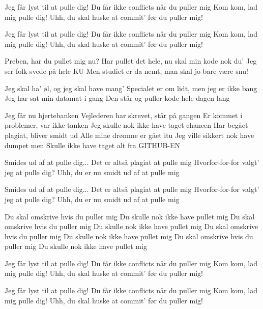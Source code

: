 \documentclass[a4paper,11pt]{article}
\begin{document}
\begin{song}
   Jeg får lyst til at pulle dig!
   Du får ikke conflicts når du puller mig
   Kom kom, lad mig pulle dig!
   Uhh, du skal huske at commit' før du puller mig!

   Jeg får lyst til at pulle dig!
   Du får ikke conflicts når du puller mig
   Kom kom, lad mig pulle dig!
   Uhh, du skal huske at commit' før du puller mig!

   Preben, har du pullet mig nu?
  Har pullet det hele, nu skal min kode nok du'
  Jeg ser folk svede på hele KU
  Men studiet er da nemt, man skal jo bare være snu!

  Jeg skal ha' øl, og jeg skal have mang'
  Specialet er om lidt, men jeg er ikke bang
  Jeg har sat min datamat i gang
  Den står og puller kode hele dagen lang

  Jeg får nu hjertebanken
  Vejlederen har skrevet, står på gangen
  Er kommet i problemer, var ikke tanken
  Jeg skulle nok ikke have taget chancen
  Har begået plagiat, bliver smidt ud
  Alle mine drømme er gået itu
  Jeg ville sikkert nok have dumpet men
  Skulle ikke have taget alt fra GITHUB-EN

   Smides ud af at pulle dig...
   Det er altså plagiat at pulle mig
   Hvorfor-for-for valgt' jeg at pulle dig?
   Uhh, du er nu smidt ud af at pulle mig

   Smides ud af at pulle dig...
   Det er altså plagiat at pulle mig
   Hvorfor-for-for valgt' jeg at pulle dig?
   Uhh, du er nu smidt ud af at pulle mig


   Du skal omskrive hvis du puller mig
   Du skulle nok ikke have pullet mig
   Du skal omskrive hvis du puller mig
   Du skulle nok ikke have pullet mig
   Du skal omskrive hvis du puller mig
   Du skulle nok ikke have pullet mig
   Du skal omskrive hvis du puller mig
   Du skulle nok ikke have pullet mig

   Jeg får lyst til at pulle dig!
   Du får ikke conflicts når du puller mig
   Kom kom, lad mig pulle dig!
   Uhh, du skal huske at commit' før du puller mig!

   Jeg får lyst til at pulle dig!
   Du får ikke conflicts når du puller mig
   Kom kom, lad mig pulle dig!
   Uhh, du skal huske at commit' før du puller mig!
\end{song}
\end{document}

